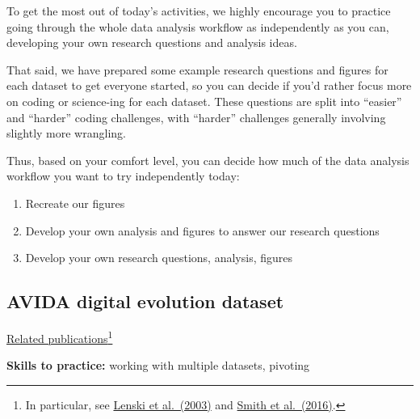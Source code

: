 \documentclass[
  letterpaper,
  DIV=11,
  numbers=noendperiod]{scrreprt}
\providecommand{\tightlist}{%
  \setlength{\itemsep}{0pt}\setlength{\parskip}{0pt}}\usepackage{longtable,booktabs,array}
\begin{document}
\begin{tcolorbox}[enhanced jigsaw, left=2mm, colframe=quarto-callout-tip-color-frame, leftrule=.75mm, opacitybacktitle=0.6, toptitle=1mm, title=\textcolor{quarto-callout-tip-color}{\faLightbulb}\hspace{0.5em}{Tip}, opacityback=0, coltitle=black, colbacktitle=quarto-callout-tip-color!10!white, breakable, colback=white, titlerule=0mm, bottomrule=.15mm, arc=.35mm, bottomtitle=1mm, rightrule=.15mm, toprule=.15mm]

To get the most out of today's activities, we highly encourage you to
practice going through the whole data analysis workflow as independently
as you can, developing your own research questions and analysis ideas.

That said, we have prepared some example research questions and figures
for each dataset to get everyone started, so you can decide if you'd
rather focus more on coding or science-ing for each dataset. These
questions are split into ``easier'' and ``harder'' coding challenges,
with ``harder'' challenges generally involving slightly more wrangling.

Thus, based on your comfort level, you can decide how much of the data
analysis workflow you want to try independently today:

\begin{enumerate}
\def\labelenumi{\arabic{enumi}.}
\tightlist
\item
  Recreate our figures
\item
  Develop your own analysis and figures to answer our research questions
\item
  Develop your own research questions, analysis, figures
\end{enumerate}

\end{tcolorbox}

\hypertarget{avida-digital-evolution-dataset}{%
\subsection{AVIDA digital evolution
dataset}\label{avida-digital-evolution-dataset}}

\href{https://avida-ed.msu.edu/digital-evolution/}{Related
publications}\footnote{In particular, see
  \href{https://www.nature.com/articles/nature01568}{Lenski et
  al.~(2003)} and
  \href{https://link.springer.com/article/10.1186/s12052-016-0060-0}{Smith
  et al.~(2016)}.}

\textbf{Skills to practice:} working with multiple datasets, pivoting
\end{document}
